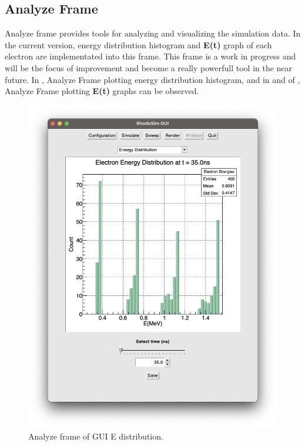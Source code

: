 \documentclass[a4paper,oneside,12pt]{report}
\numberwithin{equation}{chapter}
\begin{document}
{\subsection{Analyze Frame}
Analyze frame provides tools for analyzing and visualizing the simulation data. 
In the current version, energy distribution histogram and \textbf{E(t)} graph of each electron are implementated into this frame.
This frame is a work in progress and will be the focus of improvement and become a really powerfull tool in the near future.
In , Analyze Frame plotting energy distribution histogram, and in  and  of , Analyze Frame plotting \textbf{E(t)} graphs can be observed.
\vspace{10pt}
\begin{figure}[h!]
    \centering
    \includegraphics[width=0.8\linewidth]{./figures/rhodoSim/GUI_analyze_Edist_2.png}
    \vspace{-20pt}
    \caption{Analyze frame of GUI E distribution.}
    \label{fig:gui_analyze_Edist}
\end{figure}

}
\end{document}
